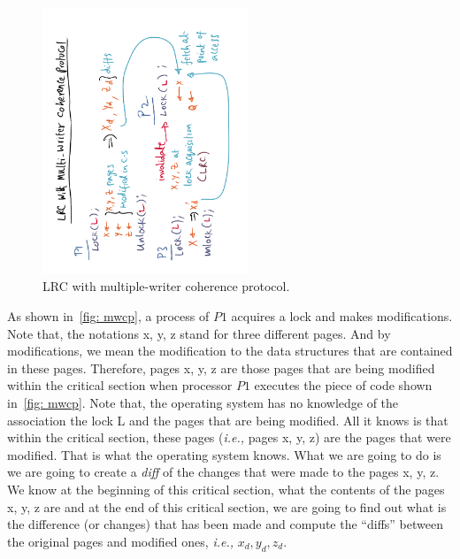 \documentclass[11pt]{lecture}
\def\fullsize{0.55\textwidth}
\begin{document}
\begin{figure}[!htbp]
\centering 
\includegraphics[width=\fullsize, angle=-90]{Figures/mwcp}
\caption{LRC with multiple-writer coherence protocol.}\label{fig: mwcp}
\end{figure}

As shown in~\autoref{fig: mwcp}, a process of $P1$ acquires a lock and makes modifications. Note that, the notations 
{\code x, y, z} stand for three different pages. And by modifications, we mean the modification to the 
data structures that are contained in these pages. Therefore, pages {\code x, y, z} are those pages 
that are being modified within the critical section when processor $P1$ executes the piece of code 
shown in~\autoref{fig: mwcp}. Note that, the operating system has no knowledge of the association the lock 
{\code L} and the pages that are being modified. All it knows is that within the critical section, 
these pages ({\it i.e.,} pages {\code x, y, z}) are the pages that were modified. That is what the operating 
system knows. What we are going to do is we are going to create a {\it diff} of the changes that 
were made to the pages {\code x, y, z}. We know at the beginning of this critical section, 
what the contents of the pages {\code x, y, z} are and at the end of this critical section, we 
are going to find out what is the difference (or changes) that has been made and compute the 
``diffs'' between the original pages and modified ones, {\it i.e.,} $x_d, y_d, z_d$. 
\end{document}
